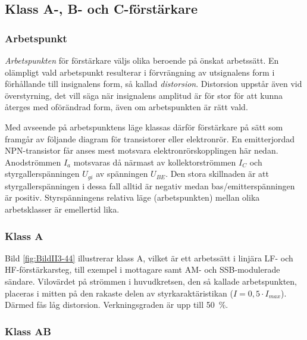 \subsection{Klass A-, B- och C-förstärkare}

\subsubsection{Arbetspunkt}

\emph{Arbetspunkten} för förstärkare väljs olika beroende på önskat arbetssätt.
En olämpligt vald arbetspunkt resulterar i förvrängning av utsignalens form i
förhållande till insignalens form, så kallad \emph{distorsion}.
Distorsion uppstår även vid överstyrning, det vill säga när insignalens
amplitud är för stor för att kunna återges med oförändrad form, även om
arbetspunkten är rätt vald.

Med avseende på arbetspunktens läge klassas därför förstärkare på sätt
som framgår av följande diagram för transistorer eller elektronrör.
En emitterjordad NPN-transistor får anses mest motsvara
elektronrörskopplingen här nedan.
Anodströmmen \(I_a\) motsvaras då närmast av kollektorströmmen
\(I_C\) och styrgallerspänningen \(U_{gi}\) av spänningen
\(U_{BE}\).
Den stora skillnaden är att styrgallerspänningen i dessa
fall alltid är negativ medan bas/emitterspänningen är positiv.
Styrspänningens relativa läge (arbetspunkten) mellan olika
arbetsklasser är emellertid lika.


\subsubsection{Klass A}

Bild \ref{fig:BildII3-44} illustrerar klass A, vilket är ett arbetssätt i linjära
LF- och HF-förstärkarsteg, till exempel i mottagare samt AM- och SSB-modulerade
sändare.
Vilovärdet på strömmen i huvudkretsen, den så kallade arbetspunkten, placeras i
mitten på den rakaste delen av styrkaraktäristikan (\(I=0,5\cdot I_{max}\)).
Därmed fås låg distorsion.
Verkningsgraden är upp till 50~\%.

\subsubsection{Klass AB}

